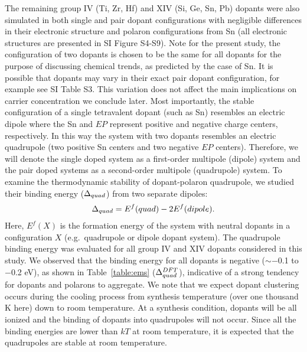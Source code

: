 The remaining group IV (Ti, Zr, Hf) and XIV (Si, Ge, Sn, Pb) dopants were also simulated in both single and pair dopant configurations with negligible differences in their electronic structure
and polaron configurations from Sn (all electronic structures are presented in SI Figure S4-S9).
Note for the present study, the configuration of two dopants is chosen to be the same for all dopants for the purpose of discussing chemical trends, as predicted by the case of Sn. It is possible that dopants may vary in their exact pair dopant configuration, for example see SI Table S3. This variation does not affect the main implications on carrier concentration we conclude later.
Most importantly, the stable configuration of a single tetravalent dopant (such as Sn) resembles an electric dipole where the Sn and $EP$ represent positive and negative charge centers, respectively. In this way the system with two dopants resembles an electric quadrupole (two positive Sn centers and two negative $EP$ centers).
Therefore, we will denote the single doped system as a first-order multipole (dipole) system and the pair doped systems as a second-order multipole (quadrupole) system.
To examine the thermodynamic stability of dopant-polaron quadrupole, we studied their binding energy ($\Delta_{quad}$) from two separate dipoles:
\begin{align}
    \Delta_{quad} = E^f(quad) - 2 E^f(dipole).
    \label{eq:be1}
\end{align}
Here, $E^f(X)$ is the formation energy of the system with neutral dopants in a configuration $X$ (e.g.\ quadrupole or dipole dopant system).
The quadrupole binding energy was evaluated for all group IV and XIV dopants considered in this study. We observed that the binding energy for all dopants is negative ($\sim-$0.1 to $-$0.2 eV), as shown in Table~\ref{table:ems} ($\Delta_{quad}^{DFT}$), indicative of a strong tendency for dopants and polarons to aggregate.
We note that we expect dopant clustering occurs during the cooling process from synthesis temperature (over one thousand K here) down to room temperature. At a synthesis condition, dopants will be all ionized and the binding of dopants into quadrupoles will not occur.
Since all the binding energies are lower than $kT$ at room temperature, it is expected that the quadrupoles are stable at room temperature.


